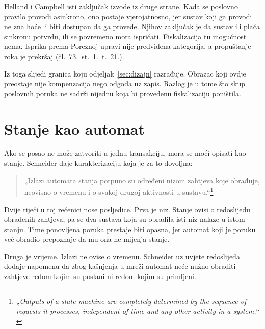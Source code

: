 Helland i Campbell isti zaključak izvode iz druge strane. Kada se poslovno
pravilo provodi asinkrono, ono postaje vjerojatnosno, jer sustav koji ga
provodi ne zna hoće li biti dostupan da ga
provede\cite{helland2009quicksand}. Njihov zaključak je da sustav ili plaća
sinkronu potvrdu, ili se povremeno mora ispričati. Fiskalizacija tu
mogućnost nema. Isprika prema Poreznoj upravi nije predviđena kategorija,
a propuštanje roka je prekršaj (čl.~73.~st.~1.~t.~21.).

Iz toga slijedi granica koju odjeljak~\ref{sec:dizajn} razrađuje. Obrazac koji
ovdje preostaje nije kompenzacija nego odgoda uz zapis. Razlog je u tome što
skup poslovnih poruka ne sadrži nijednu koja bi provedenu fiskalizaciju
poništila.

\section{Stanje kao automat}
\label{sec:automat}

Ako se posao ne može zatvoriti u jednu transakciju, mora se moći opisati
kao stanje. Schneider daje karakterizaciju koja je za to
dovoljna\cite{schneider1990statemachine}:

\begin{quote}
„Izlazi automata stanja potpuno su određeni nizom zahtjeva koje obrađuje,
neovisno o vremenu i o svakoj drugoj aktivnosti u
sustavu.“\footnote{„\emph{Outputs of a state machine are completely
determined by the sequence of requests it processes, independent of time and
any other activity in a system.}“ \cite{schneider1990statemachine}}
\end{quote}

Dvije riječi u toj rečenici nose posljedice. Prva je niz. Stanje ovisi o
redoslijedu obrađenih zahtjeva, pa se dva sustava koja su obradila isti niz
nalaze u istom stanju. Time ponovljena poruka prestaje biti opasna, jer
automat koji je poruku već obradio prepoznaje da mu ona ne mijenja stanje.

Druga je vrijeme. Izlazi ne ovise o vremenu. Schneider uz uvjete redoslijeda
dodaje napomenu da zbog kašnjenja u mreži automat neće nužno obraditi
zahtjeve redom kojim su poslani ni redom kojim su primljeni.


